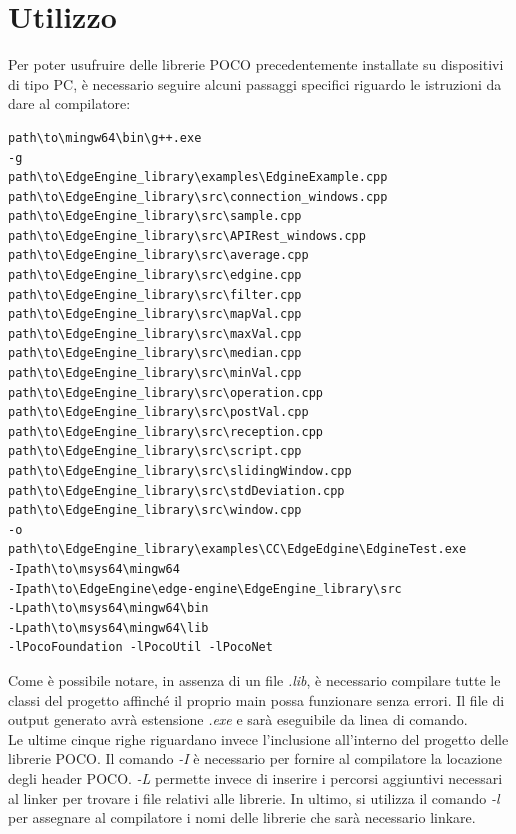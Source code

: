 \section{Utilizzo}\label{utilizzo}
Per poter usufruire delle librerie POCO precedentemente installate su dispositivi di tipo PC, è necessario seguire alcuni passaggi specifici riguardo le istruzioni da dare al compilatore:
\begin{verbatim}
path\to\mingw64\bin\g++.exe 
-g 
path\to\EdgeEngine_library\examples\EdgineExample.cpp
path\to\EdgeEngine_library\src\connection_windows.cpp
path\to\EdgeEngine_library\src\sample.cpp
path\to\EdgeEngine_library\src\APIRest_windows.cpp
path\to\EdgeEngine_library\src\average.cpp
path\to\EdgeEngine_library\src\edgine.cpp
path\to\EdgeEngine_library\src\filter.cpp
path\to\EdgeEngine_library\src\mapVal.cpp
path\to\EdgeEngine_library\src\maxVal.cpp
path\to\EdgeEngine_library\src\median.cpp
path\to\EdgeEngine_library\src\minVal.cpp
path\to\EdgeEngine_library\src\operation.cpp
path\to\EdgeEngine_library\src\postVal.cpp
path\to\EdgeEngine_library\src\reception.cpp
path\to\EdgeEngine_library\src\script.cpp
path\to\EdgeEngine_library\src\slidingWindow.cpp
path\to\EdgeEngine_library\src\stdDeviation.cpp
path\to\EdgeEngine_library\src\window.cpp
-o
path\to\EdgeEngine_library\examples\CC\EdgeEdgine\EdgineTest.exe
-Ipath\to\msys64\mingw64
-Ipath\to\EdgeEngine\edge-engine\EdgeEngine_library\src
-Lpath\to\msys64\mingw64\bin
-Lpath\to\msys64\mingw64\lib
-lPocoFoundation -lPocoUtil -lPocoNet
\end{verbatim}
Come è possibile notare, in assenza di un file \textit{.lib}, è necessario compilare tutte le classi del progetto affinché il proprio main possa funzionare senza errori. Il file di output generato avrà estensione \textit{.exe} e sarà eseguibile da linea di comando.\\
Le ultime cinque righe riguardano invece l'inclusione all'interno del progetto delle librerie POCO. Il comando \textit{-I} è necessario per fornire al compilatore la locazione degli header POCO. \textit{-L}  permette invece di inserire i percorsi aggiuntivi necessari al linker per trovare i file relativi alle librerie. In ultimo, si utilizza il comando \textit{-l} per assegnare al compilatore i nomi delle librerie che sarà necessario linkare.  
\newpage
